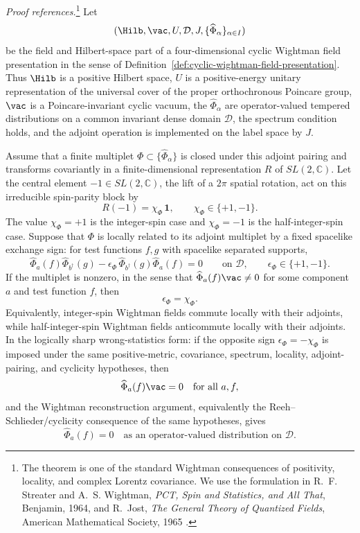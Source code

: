 \begin{quotedtheorem}
\label{thm:wightman-spin-statistics}
\emph{Proof references.}\footnote{The theorem is one of the standard
Wightman consequences of positivity, locality, and complex Lorentz
covariance.  We use the formulation in R.~F. Streater and A.~S. Wightman,
\emph{PCT, Spin and Statistics, and All That}, Benjamin, 1964, and R.~Jost,
\emph{The General Theory of Quantized Fields}, American Mathematical Society,
1965 \cite{StreaterWightman1964,Jost1965}.}
Let
\[
  (\Hilb,\vac,U,\mathcal D,J,\{\widehat\Phi_\alpha\}_{\alpha\in I})
\]
be the field and Hilbert-space part of a four-dimensional cyclic Wightman
field presentation in the sense of
Definition~\ref{def:cyclic-wightman-field-presentation}.  Thus \(\Hilb\) is a
positive Hilbert space, \(U\) is a positive-energy unitary representation of
the universal cover of the proper orthochronous Poincare group, \(\vac\) is a
Poincare-invariant cyclic vacuum, the \(\widehat\Phi_\alpha\) are
operator-valued tempered distributions on a common invariant dense domain
\(\mathcal D\), the spectrum condition holds, and the adjoint operation is
implemented on the label space by \(J\).

Assume that a finite multiplet \(\Phi\subset\{\widehat\Phi_\alpha\}\) is closed
under this adjoint pairing and transforms covariantly in a finite-dimensional
representation \(R\) of \(SL(2,\mathbb C)\).  Let the central element
\(-1\in SL(2,\mathbb C)\), the lift of a \(2\pi\) spatial rotation, act on
this irreducible spin-parity block by
\[
  R(-1)=\chi_\Phi\,\mathbf 1,
  \qquad
  \chi_\Phi\in\{+1,-1\}.
\]
The value \(\chi_\Phi=+1\) is the integer-spin case and
\(\chi_\Phi=-1\) is the half-integer-spin case.  Suppose that \(\Phi\) is
locally related to its adjoint multiplet by a fixed spacelike exchange sign:
for test functions \(f,g\) with spacelike separated supports,
\[
  \widehat\Phi_a(f)\widehat\Phi_{b^\dagger}(g)
  -
  \epsilon_\Phi\,
  \widehat\Phi_{b^\dagger}(g)\widehat\Phi_a(f)
  =
  0
  \qquad\text{on }\mathcal D,
  \qquad
  \epsilon_\Phi\in\{+1,-1\}.
\]
If the multiplet is nonzero, in the sense that
\(\widehat\Phi_a(f)\vac\ne0\) for some component \(a\) and test function
\(f\), then
\[
  \epsilon_\Phi=\chi_\Phi .
\]
Equivalently, integer-spin Wightman fields commute locally with their
adjoints, while half-integer-spin Wightman fields anticommute locally with
their adjoints.  In the logically sharp wrong-statistics form: if the
opposite sign \(\epsilon_\Phi=-\chi_\Phi\) is imposed under the same
positive-metric, covariance, spectrum, locality, adjoint-pairing, and
cyclicity hypotheses, then
\[
  \widehat\Phi_a(f)\vac=0
  \quad\text{for all }a,f,
\]
and the Wightman reconstruction argument, equivalently the
Reeh--Schlieder/cyclicity consequence of the same hypotheses, gives
\[
  \widehat\Phi_a(f)=0
  \quad\text{as an operator-valued distribution on }\mathcal D .
\]
\end{quotedtheorem}

